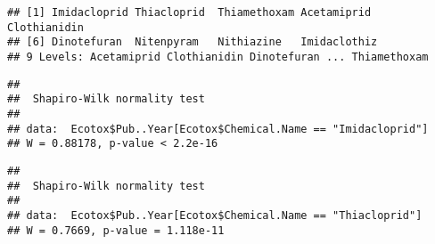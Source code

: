\documentclass[]{article}
\newenvironment{Shaded}{\begin{snugshade}}{\end{snugshade}}
\newcommand{\KeywordTok}[1]{\textcolor[rgb]{0.13,0.29,0.53}{\textbf{#1}}}
\newcommand{\StringTok}[1]{\textcolor[rgb]{0.31,0.60,0.02}{#1}}
\newcommand{\CommentTok}[1]{\textcolor[rgb]{0.56,0.35,0.01}{\textit{#1}}}
\newcommand{\OperatorTok}[1]{\textcolor[rgb]{0.81,0.36,0.00}{\textbf{#1}}}
\newcommand{\NormalTok}[1]{#1}
\begin{document}
\begin{Shaded}
\end{Shaded}

\begin{verbatim}
## [1] Imidacloprid Thiacloprid  Thiamethoxam Acetamiprid  Clothianidin
## [6] Dinotefuran  Nitenpyram   Nithiazine   Imidaclothiz
## 9 Levels: Acetamiprid Clothianidin Dinotefuran ... Thiamethoxam
\end{verbatim}

\begin{Shaded}
\end{Shaded}

\begin{verbatim}
## 
##  Shapiro-Wilk normality test
## 
## data:  Ecotox$Pub..Year[Ecotox$Chemical.Name == "Imidacloprid"]
## W = 0.88178, p-value < 2.2e-16
\end{verbatim}

\begin{Shaded}
\end{Shaded}

\begin{verbatim}
## 
##  Shapiro-Wilk normality test
## 
## data:  Ecotox$Pub..Year[Ecotox$Chemical.Name == "Thiacloprid"]
## W = 0.7669, p-value = 1.118e-11
\end{verbatim}

\begin{Shaded}
\end{Shaded}
\end{document}
